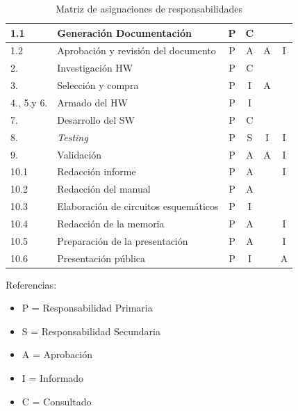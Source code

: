 \documentclass[11pt]{charter}
\begin{document}
\begin{table}[htbp]
\begin{tabularx}{\textwidth}{@{}|p{3em}|p{11em}|X|X|X|X|@{}}
\hline \rowcolor[gray]{.8}
1.1 & Generación Documentación & \multicolumn{1}{c|}{P} & \multicolumn{1}{c|}{C} & &  \\
\hline 
1.2 & Aprobación y revisión del documento &\multicolumn{1}{c|}{P} &\multicolumn{1}{c|}{A}& \multicolumn{1}{c|}{A} &\multicolumn{1}{c|}{I} \\
\hline \rowcolor[gray]{.8}
2. & Investigación HW &\multicolumn{1}{c|}{P} & \multicolumn{1}{c|}{C} &   &  \\
\hline
3. & Selección y compra &\multicolumn{1}{c|}{P} &\multicolumn{1}{c|}{I} &\multicolumn{1}{c|}{A} &  \\
\hline \rowcolor[gray]{.8}
4., 5.y 6. & Armado del HW &\multicolumn{1}{c|}{P} &\multicolumn{1}{c|}{I}  &   &  \\
\hline
7. & Desarrollo del SW &\multicolumn{1}{c|}{P} &\multicolumn{1}{c|}{C} & & \\
\hline \rowcolor[gray]{.8}
8. & \textit{Testing} &\multicolumn{1}{c|}{P} &\multicolumn{1}{c|}{S} &\multicolumn{1}{c|}{I} &\multicolumn{1}{c|}{I}\\
\hline
9. &  Validación &\multicolumn{1}{c|}{P} &\multicolumn{1}{c|}{A} &\multicolumn{1}{c|}{A} &\multicolumn{1}{c|}{I} \\
\hline \rowcolor[gray]{.8}
10.1 & Redacción informe &\multicolumn{1}{c|}{P} &\multicolumn{1}{c|}{A} &  &\multicolumn{1}{c|}{I} \\
\hline
10.2 & Redacción del manual &\multicolumn{1}{c|}{P} &\multicolumn{1}{c|}{A} &   &  \\
\hline \rowcolor[gray]{.8}
10.3 & Elaboración de circuitos esquemáticos &\multicolumn{1}{c|}{P} &  \multicolumn{1}{c|}{I} &   & \\
\hline
10.4 & Redacción de la memoria &\multicolumn{1}{c|}{P}  &\multicolumn{1}{c|}{A} &   &\multicolumn{1}{c|}{I} \\
\hline \rowcolor[gray]{.8}
10.5 & Preparación de la presentación &\multicolumn{1}{c|}{P}  &\multicolumn{1}{c|}{A} &  &\multicolumn{1}{c|}{I} \\
\hline
10.6 & Presentación pública &\multicolumn{1}{c|}{P} &\multicolumn{1}{c|}{I} &  & \multicolumn{1}{c|}{A} \\
\hline 
\end{tabularx}%
\caption{Matriz de asignaciones de responsabilidades}
\label{tab:addlabel}
\end{table}

{\footnotesize
Referencias:
\begin{itemize}
	\item P = Responsabilidad Primaria
	\item S = Responsabilidad Secundaria
	\item A = Aprobación
	\item I = Informado
	\item C = Consultado
\end{itemize}
} %
\end{document}
